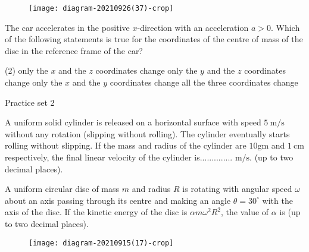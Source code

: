 \begin{enumerate}
\begin{minipage}{\textwidth}
	\begin{figure}[H]
		\centering
		\texttt{[image: diagram-20210926(37)-crop]}
	\end{figure}
	The car accelerates in the positive $x$-direction with an acceleration $a>0 .$ Which of the following statements is true for the coordinates of the centre of mass of the disc in the reference frame of the car?
\end{minipage}
\begin{tasks}(2)
	\task[\textbf{A.}] only the $x$ and the $z$ coordinates change
	\task[\textbf{B.}]only the $y$ and the $z$ coordinates change
	\task[\textbf{C.}]only the $x$ and the $y$ coordinates change
	\task[\textbf{D.}]all the three coordinates change
\end{tasks}
\end{enumerate}


\newpage
\begin{abox}
	Practice set 2
	\end{abox}
\begin{enumerate}
\begin{minipage}{\textwidth}
	\item A uniform solid cylinder is released on a horizontal surface with speed $5 \mathrm{~m} / \mathrm{s}$ without any rotation (slipping without rolling). The cylinder eventually starts rolling without slipping. If the mass and radius of the cylinder are $10 \mathrm{gm}$ and $1 \mathrm{~cm}$ respectively, the final linear velocity of the cylinder is.............. $\mathrm{m} / \mathrm{s}$. (up to two decimal places).
\end{minipage}
\begin{minipage}{\textwidth}
	\item A uniform circular disc of mass $m$ and radius $R$ is rotating with angular speed $\omega$ about an axis passing through its centre and making an angle $\theta=30^{\circ}$ with the axis of the disc. If the kinetic energy of the disc is $\alpha m \omega^{2} R^{2}$, the value of $\alpha$ is (up to two decimal places).
	\begin{figure}[H]
		\centering
		\texttt{[image: diagram-20210915(17)-crop]}
	\end{figure}
\end{minipage}
\end{enumerate}
























